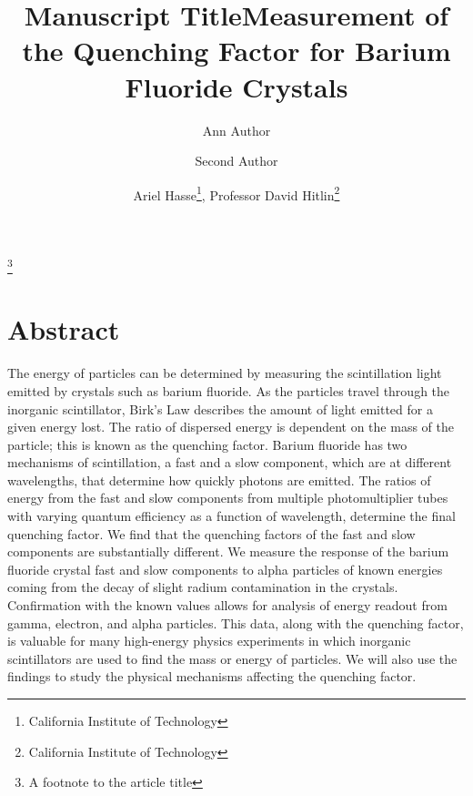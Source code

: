 \documentclass{article}
\begin{document}

\title{Manuscript Title}
\thanks{A footnote to the article title}%

\author{Ann Author}
\author{Second Author}%
%

\title{\large Measurement of the Quenching Factor for Barium Fluoride Crystals}
\author{Ariel Hasse\thanks{California Institute of Technology}, Professor David Hitlin\thanks{California Institute of Technology}}
\date{}
\maketitle


\section{Abstract}
The energy of particles can be determined by measuring the scintillation light emitted by crystals such as barium fluoride. As the particles travel through the inorganic scintillator, Birk’s Law describes the amount of light emitted for a given energy lost. The ratio of dispersed energy is dependent on the mass of the particle; this is known as the quenching factor. Barium fluoride has two mechanisms of scintillation, a fast and a slow component, which are at different wavelengths, that determine how quickly photons are emitted. The ratios of energy from the fast and slow components from multiple photomultiplier tubes with varying quantum efficiency as a function of wavelength, determine the final quenching factor. We find that the quenching factors of the fast and slow components are substantially different.
We measure the response of the barium fluoride crystal fast and slow components to alpha particles of known energies coming from the decay of slight radium contamination in the crystals. Confirmation with the known values allows for analysis of energy readout from gamma, electron, and alpha particles. This data, along with the quenching factor, is valuable for many high-energy physics experiments in which inorganic scintillators are used to find the mass or energy of particles. We will also use the findings to study the physical mechanisms affecting the quenching factor.
\end{document}
